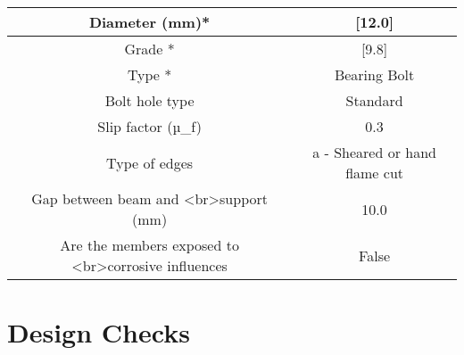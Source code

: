 \documentclass{article}%
\begin{document}
\begin{longtable}{|p{5cm}|p{2cm}|p{2cm}|p{2cm}|p{5cm}|}
\hline%
\hline%
\multicolumn{3}{|c|}{Diameter (mm)*}&\multicolumn{2}{|c|}{{[}12.0{]}}\\%
\hline%
\hline%
\multicolumn{3}{|c|}{Grade *}&\multicolumn{2}{|c|}{{[}9.8{]}}\\%
\hline%
\hline%
\multicolumn{3}{|c|}{Type *}&\multicolumn{2}{|c|}{Bearing Bolt}\\%
\hline%
\hline%
\multicolumn{3}{|c|}{Bolt hole type}&\multicolumn{2}{|c|}{Standard}\\%
\hline%
\hline%
\multicolumn{3}{|c|}{Slip factor (µ\_f)}&\multicolumn{2}{|c|}{0.3}\\%
\hline%
\hline%
\multicolumn{3}{|c|}{Type of edges}&\multicolumn{2}{|c|}{a {-} Sheared or hand flame cut}\\%
\hline%
\hline%
\multicolumn{3}{|c|}{Gap between beam and <br>support (mm)}&\multicolumn{2}{|c|}{10.0}\\%
\hline%
\hline%
\multicolumn{3}{|c|}{Are the members exposed to <br>corrosive influences}&\multicolumn{2}{|c|}{False}\\%
\hline%
\end{longtable}

%
%
\newpage%
\section{Design Checks}%
\label{sec:DesignChecks}%
\end{document}

